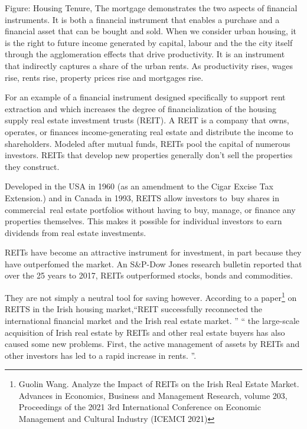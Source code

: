 Figure: Housing Tenure, 
The mortgage demonstrates the two aspects of financial instruments. It is both a financial instrument that enables a purchase and a financial asset that can be bought and sold. When we consider urban housing, it is the right to future income generated by capital, labour and the the city itself through the agglomeration effects that drive productivity. It is an instrument that indirectly captures a share of the urban rents. As productivity rises, wages rise, rents rise, property prices rise and mortgages rise. 


For an example of a financial instrument designed specifically to support rent extraction and which  increases the degree of financialization of the housing supply  real estate investment trusts (REIT). A REIT is a company that owns, operates, or finances income-generating real estate and distribute the income to shareholders. Modeled after mutual funds, REITs pool the capital of numerous investors. REITs that develop new properties generally don't sell the properties they construct.

Developed in the USA  in 1960 (as an amendment to the Cigar Excise Tax Extension.) and in Canada in 1993, REITS allow investors to buy shares in commercial real estate portfolios without having to buy, manage, or finance any properties themselves. This makes it possible for individual investors to earn dividends from real estate investments.  

REITs have become an attractive instrument for investment, in part because they have outperfomed the market. An S\&P-Dow Jones research bulletin reported that over the  25 years to 2017, REITs outperformed stocks, bonds and commodities. 

They are not simply a neutral tool for saving however. 
According to a paper\footnote{ Guolin Wang. Analyze the Impact of REITs on the Irish Real Estate Market. Advances in Economics, Business and Management Research, volume 203, Proceedings of the 2021 3rd International Conference on Economic Management and Cultural Industry (ICEMCI 2021)} on REITS in the Irish housing market,``REIT successfully reconnected the international financial market and the Irish real estate market. '' `` the large-scale acquisition of Irish real estate by REITs and other real estate buyers has also caused some new problems. First, the active management of assets by REITs and other investors has led to a rapid increase in rents. ''. 

